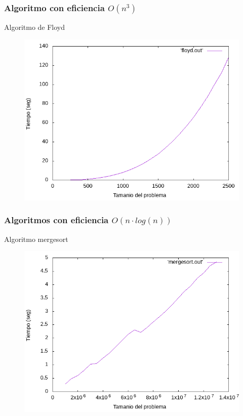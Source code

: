 \documentclass{beamer}
\begin{document}
\subsubsection{Algoritmo con eficiencia $O(n^3)$}
\begin{frame}[fragile]{Algoritmo de Floyd}
\begin{figure}[H]
\centering
\includegraphics[scale=0.5]{empirica_floyd.png}
\end{figure}
\end{frame}

\subsubsection{Algoritmos con eficiencia $O(n \cdot log(n))$}

\begin{frame}[fragile]{Algoritmo mergesort}
\begin{figure}[H]
\centering
\includegraphics[scale=0.5]{empirica_mergesort.png}
\end{figure}
\end{frame}
\end{document}
